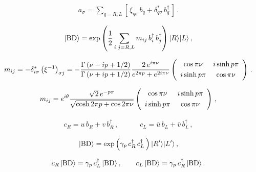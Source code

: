 \begin{eqnarray}
a_\sigma=\sum_{q=R,L}\left[\,\xi_{q\sigma}\,b_q+\delta_{q\sigma}^*\,b_q^\dagger\,\right]\,.
\label{ab}
\end{eqnarray}


\begin{eqnarray}
|{\rm BD}\rangle = \exp\left(\frac{1}{2}\sum_{i,j=R,L}m_{ij}\,b_i^\dagger\, b_j^\dagger\right) |R\rangle|L\rangle\,,
\label{bogoliubov1}
\end{eqnarray}

\begin{eqnarray}
m_{ij}=-\delta_{i\sigma}^*\left(\xi^{-1}\right)_{\sigma j}
=-\frac{\Gamma\left(\nu-ip+1/2\right)}{\Gamma\left(\nu+ip+1/2\right)}
\frac{2\,e^{i\pi\nu}}{e^{2\pi p}+e^{2i\pi\nu}}
\left(
\begin{array}{cc}
\cos \pi\nu & i\sinh p\pi \vspace{1mm}\\
i\sinh p\pi & \cos \pi\nu \\
\end{array}
\right)\,.
\label{mij1}
\end{eqnarray}


\begin{eqnarray}
m_{ij}=e^{i\theta}\frac{\sqrt{2}\,e^{-p\pi}}{\sqrt{\cosh 2\pi p+\cos 2\pi\nu}}
\left(
\begin{array}{cc}
\cos \pi\nu & i\sinh p\pi \vspace{1mm}\\
i\sinh p\pi & \cos \pi\nu \\
\end{array}
\right)\,,
\label{mij2}
\end{eqnarray}



\begin{eqnarray}
c_R = u\,b_R + v\,b_R^\dagger \,,\qquad\quad
c_L = \bar{u}\,b_L + \bar{v}\,b_L^\dagger\,,
\label{bc}
\end{eqnarray}


\begin{eqnarray}
|{\rm BD}\rangle = \exp\left(\gamma_p\,c_R^\dagger\,c_L^\dagger\,\right)|R'\rangle|L'\rangle\,,
\label{bogoliubov2}
\end{eqnarray}


\begin{eqnarray}
c_R\,|{\rm BD}\rangle= \gamma_p\,c_L^\dagger\,|{\rm BD}\rangle \,,\qquad
c_L\,|{\rm BD}\rangle = \gamma_p\,c_R^\dagger\,|{\rm BD}\rangle\,.
\label{consistency}
\end{eqnarray}

